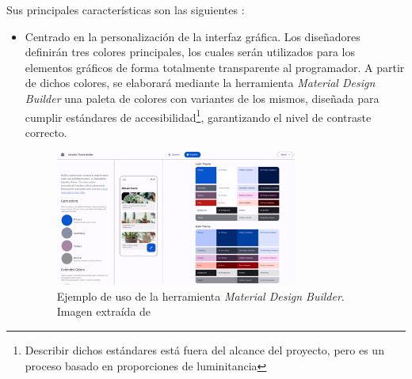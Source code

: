             Sus principales características son las siguientes \cite{noauthor_material_nodate}:
            \begin{itemize}
                \item Centrado en la personalización de la interfaz gráfica. Los diseñadores definirán tres colores
                principales, los cuales serán utilizados para los elementos gráficos de forma totalmente transparente
                al programador. A partir de dichos colores, se elaborará mediante la herramienta 
                \textit{Material Design Builder} \cite{noauthor_material_nodate-1} una paleta de colores con 
                variantes de los mismos, 
                diseñada para cumplir estándares de accesibilidad\footnote{Describir dichos
                estándares está fuera del alcance del proyecto, pero es un proceso basado en proporciones de 
                luminitancia}, garantizando el nivel de contraste correcto.

                    \begin{figure}[h]
                        \centering
                        \includegraphics[width=0.75\textwidth]{figures/Material Design Builder example.png}
                        \caption[Ejemplo de uso de la herramienta \textit{Material Design Builder}]
                        {Ejemplo de uso de la herramienta \textit{Material Design Builder}. Imagen extraída de \cite{singh_material_2022}}
                        \label{figure:material_design_3:builder}
                    \end{figure}


\end{itemize}
